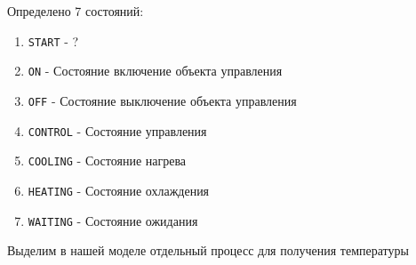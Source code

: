 \documentclass[12pt, twoside]{report}
\begin{document}
Определено 7 состояний:
\begin{enumerate}
  \item \texttt{START} - ?
  \item \texttt{ON} - Состояние включение объекта управления
  \item \texttt{OFF} - Состояние выключение объекта управления
  \item \texttt{CONTROL} - Состояние управления
  \item \texttt{COOLING} - Состояние нагрева
  \item \texttt{HEATING} - Состояние охлаждения
  \item \texttt{WAITING} - Состояние ожидания
\end{enumerate}

Выделим в нашей моделе отдельный процесс для получения температуры
\end{document}
